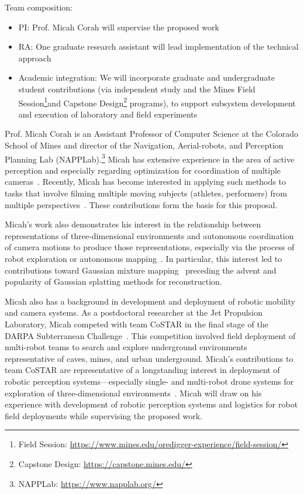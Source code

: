 \documentclass[11pt]{article}
\begin{document}
\noindent
Team composition:
\begin{itemize}
  \item PI: Prof. Micah Corah will supervise the proposed work
  \item RA: One graduate research assistant will lead implementation of the
    technical approach
  \item Academic integration: We will incorporate graduate and
    undergraduate student contributions
    (via independent study and the Mines Field Session\footnote{%
      Field Session:
      \url{https://www.mines.edu/oredigger-experience/field-session/}
    }and Capstone Design\footnote{%
      Capstone Design: \url{https://capstone.mines.edu/}
    } programs),
    to support subsystem development and
    execution of laboratory and field experiments
\end{itemize}

Prof. Micah Corah is an Assistant Professor of Computer Science at the Colorado
School of Mines and director of the
Navigation, Aerial-robots, and Perception Planning Lab (NAPPLab).\footnote{%
  NAPPLab: \url{https://www.napplab.org/}
}
Micah has extensive experience in the area of active perception and especially
regarding optimization for coordination of multiple
cameras~\citep{corah2019auro,corah2018cdc,corah2021iros}.
Recently, Micah has become interested in applying such methods to tasks that
involve filming multiple moving subjects (athletes, performers) from multiple
perspectives~\citep{suresh2024iros,hughes2024cdc}.
These contributions form the basis for this proposal.

Micah's work also demonstrates his interest in the relationship between
representations of three-dimensional environments and autonomous coordination of
camera motions to produce those representations, especially via the process of
robot exploration or autonomous
mapping~\citep{corah2019ral,corah2021icra,corah2019auro,goel2019fsr,kim2023ral}.
In particular, this interest led to contributions toward Gaussian mixture
mapping~\citep{corah2019ral} preceding the advent and popularity of Gaussian
splatting methods for reconstruction.

Micah also has a background in development and deployment of robotic mobility
and camera systems.
As a postdoctoral researcher at the Jet Propulsion Laboratory, Micah competed
with team CoSTAR in the final stage of the DARPA Subterranean
Challenge~\citep{morrell2024addendum}.
This competition involved field deployment of multi-robot teams to search and
explore underground environments representative of caves, mines, and urban
underground.
Micah's contributions to team CoSTAR are representative of a longstanding
interest in deployment of robotic perception systems---especially single- and
multi-robot drone systems for exploration of
three-dimensional environments~\citep{corah2019auro,kim2023ral,goel2019fsr}.
Micah will draw on his experience with development of robotic perception systems
and logistics for robot field deployments while supervising the proposed work.
\end{document}

